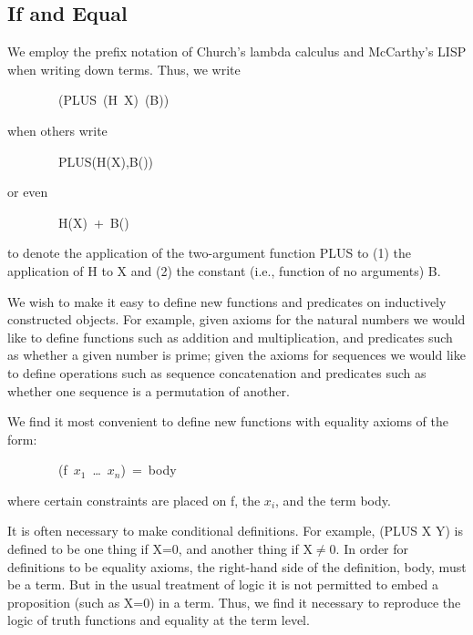 \documentclass[11pt]{book}
\newenvironment{pubasis}{\begin{flushleft}\ttfamily\small}{\normalsize\rmfamily\end{flushleft}}
\newcommand{\pubdefaulttextsize}{\large}
\begin{document}
\subsection{If and Equal}
\pubdefaulttextsize
We employ the prefix notation of Church's lambda calculus \cite{CHURCHLAMBDA}
and McCarthy's LISP \cite{LISPMANUAL} when writing down terms.  Thus,
we write
\begin{pubasis}
~~~~~~~~(PLUS~(H~X)~(B))\\
\end{pubasis}
when others write
\begin{pubasis}
~~~~~~~~PLUS(H(X),B())\\
\end{pubasis}
or even
\begin{pubasis}
~~~~~~~~H(X)~+~B()\\
\end{pubasis}
to denote the application of the two-argument function PLUS to (1) the
application of H to X and (2) the constant (i.e., function of no arguments) B.

We wish to make it easy to define new functions and predicates on
inductively constructed objects.
For example, given axioms for the natural numbers we would like
to define functions such as addition and multiplication, and
predicates such as whether a given number is prime; given the axioms
for sequences we would like to define operations such as sequence concatenation
and predicates such as whether one sequence is a permutation of
another.

We find it most convenient to define new functions with equality axioms of the form:
\begin{pubasis}
~~~~~~~~(f~$x_{1}$~\ldots{}~$x_{n}$)~=~body~\\
\end{pubasis}
where certain constraints are placed on f, the $x_{i}$, and the term body.

It is often necessary to make conditional definitions.
For example,
(PLUS X Y) is defined to be one thing if X=0,  and another thing
if X$\neq$0.
In order for definitions to be equality axioms, the right-hand
side of the definition, body, must be a term.
But in the usual treatment of logic it is not
permitted to embed a proposition (such as X=0) in a term.
Thus, we find it necessary to reproduce the logic of truth functions
and equality at the term level.
\end{document}
